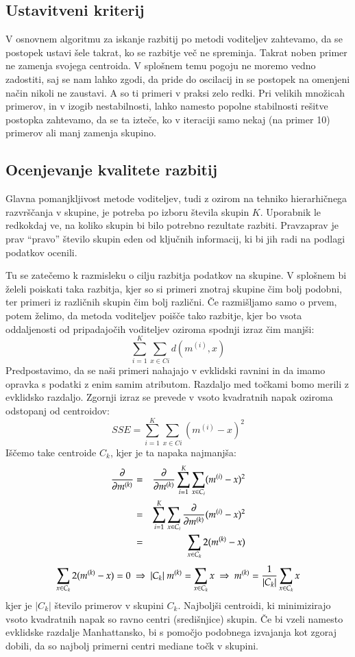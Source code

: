 \subsection{Ustavitveni kriterij}

V osnovnem algoritmu za iskanje razbitij po metodi voditeljev
zahtevamo, da se postopek ustavi šele takrat, ko se razbitje več ne
spreminja. Takrat noben primer ne zamenja svojega centroida. V
splošnem temu pogoju ne moremo vedno zadostiti, saj se nam lahko
zgodi, da pride do oscilacij in se postopek na omenjeni način nikoli
ne zaustavi. A so ti primeri v praksi zelo redki. Pri velikih množicah
primerov, in v izogib nestabilnosti, lahko namesto popolne stabilnosti
rešitve postopka zahtevamo, da se ta izteče, ko v iteraciji samo nekaj
(na primer 10) primerov ali manj zamenja skupino.

\subsection{Ocenjevanje kvalitete razbitij}

Glavna pomanjkljivost metode voditeljev, tudi z ozirom na tehniko
hierarhičnega razvrščanja v skupine, je potreba po izboru števila
skupin $K$. Uporabnik le redkokdaj ve, na koliko skupin bi bilo
potrebno rezultate razbiti. Pravzaprav je prav ``pravo'' število
skupin eden od ključnih informacij, ki bi jih radi na podlagi podatkov
ocenili.

Tu se zatečemo k razmisleku o cilju razbitja podatkov na skupine. V
splošnem bi želeli poiskati taka razbitja, kjer so si primeri znotraj
skupine čim bolj podobni, ter primeri iz različnih skupin čim bolj
različni. Če razmišljamo samo o prvem, potem želimo, da metoda
voditeljev poišče tako razbitje, kjer bo vsota oddaljenosti od
pripadajočih voditeljev oziroma spodnji izraz čim manjši:
%
$$ \sum_{i=1}^K \sum_{x\in Ci} d(m^{(i)}, x) $$
%
Predpostavimo, da se naši primeri nahajajo v evklidski ravnini in da imamo opravka s podatki z enim samim atributom. Razdaljo med točkami bomo merili z evklidsko razdaljo. Zgornji izraz se prevede v vsoto kvadratnih napak  oziroma odstopanj od centroidov:
%
$$SSE = \sum_{i=1}^K \sum_{x\in Ci}(m^{(i)}-x)^2$$
%
Iščemo take centroide $C_k$, kjer je ta napaka najmanjša:
\begin{eqnarray}
\frac{\partial}{\partial m^{(k)}} & = & \frac{\partial}{\partial m^{(k)}}\sum_{i=1}^K\sum_{x\in C_i}(m^{(i)}-x)^2  \\
& = & \sum_{i=1}^K\sum_{x\in C_i} \frac{\partial}{\partial m^{(k)}}(m^{(i)}-x)^2 \\
& = & \sum_{x\in C_k} 2 (m^{(k)}-x)
\end{eqnarray}
%
\begin{equation}
\sum_{x\in C_k} 2 (m^{(k)}-x) = 0 \ \Rightarrow \ |C_k|\ m^{(k)} = \sum_{x\in C_k}
  x \ \Rightarrow \ m^{(k)} = {1 \over |C_k|} \sum_{x\in C_k}x
\end{equation}
%
kjer je $|C_k|$ število primerov v skupini $C_k$. Najboljši centroidi,
ki minimizirajo vsoto kvadratnih napak so ravno centri (središnjice)
skupin. Če bi vzeli namesto evklidske razdalje Manhattansko, bi s
pomočjo podobnega izvajanja kot zgoraj dobili, da so najbolj primerni
centri mediane točk v skupini.

